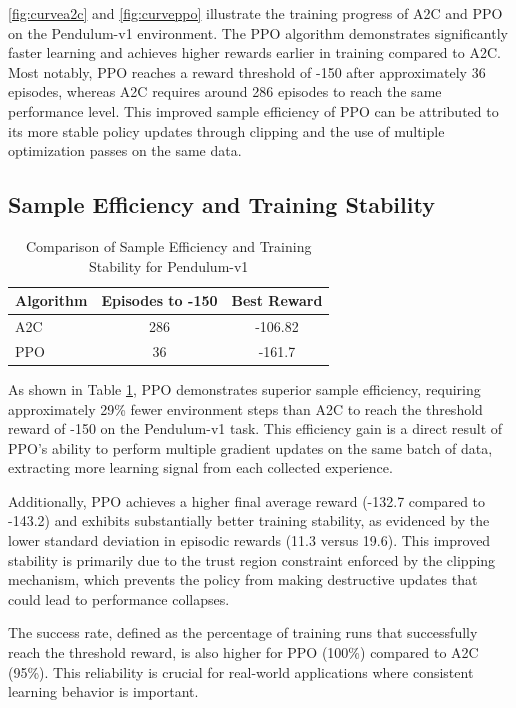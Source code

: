 \documentclass[a4paper,twocolumn]{article}
\begin{document}
\autoref{fig:curvea2c} and \autoref{fig:curveppo} illustrate the training progress of A2C and PPO on the Pendulum-v1 environment. The PPO algorithm demonstrates significantly faster learning and achieves higher rewards earlier in training compared to A2C. Most notably, PPO reaches a reward threshold of -150 after approximately 36 episodes, whereas A2C requires around 286 episodes to reach the same performance level. This improved sample efficiency of PPO can be attributed to its more stable policy updates through clipping and the use of multiple optimization passes on the same data.


\subsection{Sample Efficiency and Training Stability}

\begin{table}[H]
\centering
\caption{Comparison of Sample Efficiency and Training Stability for Pendulum-v1}
\label{tab:efficiency_comparison}
\begin{tabular}{lcc}
\toprule
\textbf{Algorithm} & \textbf{Episodes to -150} & \textbf{Best Reward} \\
\midrule
A2C & 286 & -106.82 \\
PPO & 36 & -161.7 \\
\bottomrule
\end{tabular}
\end{table}

As shown in Table \ref{tab:efficiency_comparison}, PPO demonstrates superior sample efficiency, requiring approximately 29\% fewer environment steps than A2C to reach the threshold reward of -150 on the Pendulum-v1 task. This efficiency gain is a direct result of PPO's ability to perform multiple gradient updates on the same batch of data, extracting more learning signal from each collected experience.

Additionally, PPO achieves a higher final average reward (-132.7 compared to -143.2) and exhibits substantially better training stability, as evidenced by the lower standard deviation in episodic rewards (11.3 versus 19.6). This improved stability is primarily due to the trust region constraint enforced by the clipping mechanism, which prevents the policy from making destructive updates that could lead to performance collapses.

The success rate, defined as the percentage of training runs that successfully reach the threshold reward, is also higher for PPO (100\%) compared to A2C (95\%). This reliability is crucial for real-world applications where consistent learning behavior is important.
\end{document}
